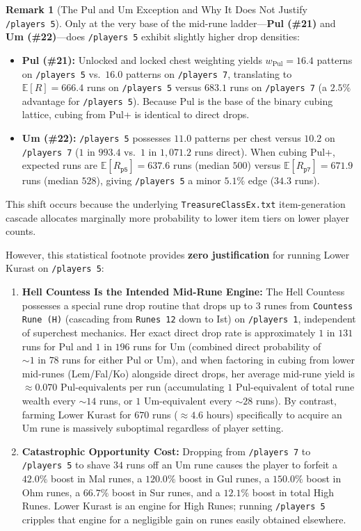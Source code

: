 \documentclass[11pt,reqno]{amsart}
\theoremstyle{definition}
\newtheorem{remark}[theorem]{Remark}
\begin{document}
\begin{remark}[The Pul and Um Exception and Why It Does Not Justify \texttt{/players~5}]
\label{rem:pul_um}
Only at the very base of the mid-rune ladder—\textbf{Pul (\#21)} and \textbf{Um (\#22)}—does \texttt{/players~5} exhibit slightly higher drop densities:
\begin{itemize}
    \item \textbf{Pul (\#21):} Unlocked and locked chest weighting yields $w_{\text{Pul}} = 16.4$ patterns on \texttt{/players~5} vs.\ $16.0$ patterns on \texttt{/players~7}, translating to $\mathbb{E}[R] = 666.4$ runs on \texttt{/players~5} versus $683.1$ runs on \texttt{/players~7} (a $2.5\%$ advantage for \texttt{/players~5}). Because Pul is the base of the binary cubing lattice, cubing from Pul+ is identical to direct drops.
    \item \textbf{Um (\#22):} \texttt{/players~5} possesses $11.0$ patterns per chest versus $10.2$ on \texttt{/players~7} ($1\text{ in }993.4$ vs.\ $1\text{ in }1{,}071.2$ runs direct). When cubing Pul+, expected runs are $\mathbb{E}[R_{\texttt{p5}}] = 637.6$ runs (median $500$) versus $\mathbb{E}[R_{\texttt{p7}}] = 671.9$ runs (median $528$), giving \texttt{/players~5} a minor $5.1\%$ edge ($34.3$ runs).
\end{itemize}
This shift occurs because the underlying \texttt{TreasureClassEx.txt} item-generation cascade allocates marginally more probability to lower item tiers on lower player counts. 

However, this statistical footnote provides \textbf{zero justification} for running Lower Kurast on \texttt{/players~5}:
\begin{enumerate}
    \item \textbf{Hell Countess Is the Intended Mid-Rune Engine:} The Hell Countess possesses a special rune drop routine that drops up to $3$ runes from \texttt{Countess Rune (H)} (cascading from \texttt{Runes~12} down to Ist) on \texttt{/players~1}, independent of superchest mechanics. Her exact direct drop rate is approximately $1\text{ in }131$ runs for Pul and $1\text{ in }196$ runs for Um (combined direct probability of $\sim 1\text{ in }78$ runs for either Pul or Um), and when factoring in cubing from lower mid-runes (Lem/Fal/Ko) alongside direct drops, her average mid-rune yield is $\approx 0.070\text{ Pul-equivalents per run}$ (accumulating $1\text{ Pul-equivalent}$ of total rune wealth every $\sim 14$ runs, or $1\text{ Um-equivalent}$ every $\sim 28$ runs). By contrast, farming Lower Kurast for $670$ runs ($\approx 4.6\text{ hours}$) specifically to acquire an Um rune is massively suboptimal regardless of player setting.
    \item \textbf{Catastrophic Opportunity Cost:} Dropping from \texttt{/players~7} to \texttt{/players~5} to shave $34$ runs off an Um rune causes the player to forfeit a $42.0\%$ boost in Mal runes, a $120.0\%$ boost in Gul runes, a $150.0\%$ boost in Ohm runes, a $66.7\%$ boost in Sur runes, and a $12.1\%$ boost in total High Runes. Lower Kurast is an engine for High Runes; running \texttt{/players~5} cripples that engine for a negligible gain on runes easily obtained elsewhere.
\end{enumerate}
\end{remark}
\end{document}
